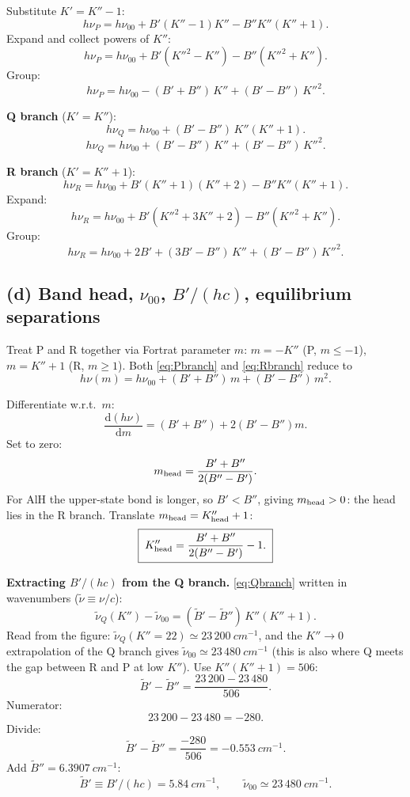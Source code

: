 \documentclass[11pt]{article}
\newcommand{\de}{\mathrm{d}}
\begin{document}
Substitute $K'=K''-1$:
\[
h\nu_{P} = h\nu_{00} + B'(K''-1)K'' - B''K''(K''+1).
\]
Expand and collect powers of $K''$:
\[
h\nu_{P} = h\nu_{00} + B'(K''^{2}-K'') - B''(K''^{2}+K'').
\]
Group:
\begin{equation}
\boxed{\;h\nu_{P}=h\nu_{00}-(B'+B'')\,K''+(B'-B'')\,K''^{2}.\;}
\label{eq:Pbranch}
\end{equation}

\textbf{Q branch} ($K'=K''$):
\[
h\nu_{Q}=h\nu_{00}+(B'-B'')\,K''(K''+1).
\]
\begin{equation}
\boxed{\;h\nu_{Q}=h\nu_{00}+(B'-B'')\,K''+(B'-B'')\,K''^{2}.\;}
\label{eq:Qbranch}
\end{equation}

\textbf{R branch} ($K'=K''+1$):
\[
h\nu_{R}=h\nu_{00}+B'(K''+1)(K''+2)-B''K''(K''+1).
\]
Expand:
\[
h\nu_{R}=h\nu_{00}+B'(K''^{2}+3K''+2)-B''(K''^{2}+K'').
\]
Group:
\begin{equation}
\boxed{\;h\nu_{R}=h\nu_{00}+2B'+(3B'-B'')\,K''+(B'-B'')\,K''^{2}.\;}
\label{eq:Rbranch}
\end{equation}

\subsection*{(d) Band head, $\nu_{00}$, $B'/(hc)$, equilibrium separations}

Treat P and R together via Fortrat parameter $m$: $m=-K''$ (P, $m\le -1$), $m=K''+1$ (R, $m\ge 1$). Both \eqref{eq:Pbranch} and \eqref{eq:Rbranch} reduce to
\[
h\nu(m)=h\nu_{00}+(B'+B'')\,m+(B'-B'')\,m^{2}.
\]

Differentiate w.r.t.\ $m$:
\[
\frac{\de(h\nu)}{\de m}=(B'+B'')+2(B'-B'')m.
\]
Set to zero:
\[
m_{\rm head}=\frac{B'+B''}{2(B''-B')}.
\]
For AlH the upper-state bond is longer, so $B'<B''$, giving $m_{\rm head}>0$: the head lies in the R branch. Translate $m_{\rm head}=K''_{\rm head}+1$:
\begin{equation}
\boxed{\;K''_{\rm head}=\frac{B'+B''}{2(B''-B')}-1.\;}
\label{eq:Khead}
\end{equation}

\textbf{Extracting $B'/(hc)$ from the Q branch.} \eqref{eq:Qbranch} written in wavenumbers ($\tilde\nu\equiv\nu/c$):
\[
\tilde\nu_{Q}(K'')-\tilde\nu_{00}=(\tilde B'-\tilde B'')\,K''(K''+1).
\]
Read from the figure: $\tilde\nu_{Q}(K''=22)\simeq 23\,200\ \si{cm^{-1}}$, and the $K''\!\to\!0$ extrapolation of the Q branch gives $\tilde\nu_{00}\simeq 23\,480\ \si{cm^{-1}}$ (this is also where Q meets the gap between R and P at low $K''$). Use $K''(K''+1)=506$:
\[
\tilde B'-\tilde B''=\frac{23\,200-23\,480}{506}.
\]
Numerator:
\[
23\,200-23\,480=-280.
\]
Divide:
\[
\tilde B'-\tilde B''=\frac{-280}{506}=-0.553\ \si{cm^{-1}}.
\]
Add $\tilde B''=6.3907\ \si{cm^{-1}}$:
\[
\boxed{\;\tilde B'\equiv B'/(hc)=5.84\ \si{cm^{-1}},\qquad\tilde\nu_{00}\simeq 23\,480\ \si{cm^{-1}}.\;}
\]
\end{document}
